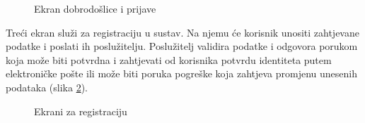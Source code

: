 \documentclass[times, utf8, zavrsni]{fer}
\begin{document}
\begin{figure}[h]
      \caption{Ekran dobrodošlice i prijave}
      \label{fig:WelcomeLogin}
\end{figure}\newpage
Treći ekran služi za registraciju u sustav. Na njemu će korisnik unositi zahtjevane podatke i
poslati ih poslužitelju. Poslužitelj validira podatke i odgovora porukom koja može biti potvrdna i zahtjevati
od korisnika potvrdu identiteta putem elektroničke pošte ili može biti poruka pogreške koja zahtjeva promjenu unesenih
podataka (slika \ref*{fig:Register}).
\begin{figure}[h]
      \centering
      \caption{Ekrani za registraciju}
      \label{fig:Register}
\end{figure}\\
\end{document}
